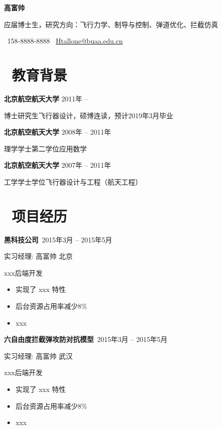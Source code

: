 \documentclass[11pt]{article}
\begin{document}

\centerline{\LARGE\bfseries{高富帅}}

\centerline{\normalsize{应届博士生，研究方向：飞行力学、制导与控制、弹道优化、拦截仿真}}

\centerline{\normalsize{\faPhone\ 158-8888-8888 \quad \faEnvelopeO\ \href{mailto:Htallone@buaa.edu.cn}{Htallone@buaa.edu.cn}}}
 
\section{\makebox[\widthof{\faGraduationCap}][c]{\color{CVBlue}\faGraduationCap}\  教育背景}

\textbf{北京航空航天大学} \hfill 2011年 -- 

博士研究生\quad 飞行器设计，硕博连读，预计2019年3月毕业

\textbf{北京航空航天大学} \hfill 2008年 -- 2011年

理学学士第二学位\quad 应用数学

\textbf{北京航空航天大学} \hfill 2007年 -- 2011年

工学学士学位\quad 飞行器设计与工程（航天工程）

\section{\makebox[\widthof{\faGraduationCap}][c]{\color{CVBlue}\faUsers}\ 项目经历}

\textbf{黑科技公司}\  \hfill 2015年3月 -- 2015年5月

实习\quad 经理: 高富帅 \hfill 北京

xxx后端开发
\begin{itemize}
  \item 实现了 xxx 特性
  \item 后台资源占用率减少8\%
  \item xxx
\end{itemize}

\textbf{六自由度拦截弹攻防对抗模型\Cpp}\  \hfill 2015年3月 -- 2015年5月

实习\quad 经理: 高富帅  \hfill 武汉

xxx后端开发\Cpp
\begin{itemize}
  \item 实现了 xxx 特性
  \item 后台资源占用率减少8\%
  \item xxx
\end{itemize}
\end{document}
